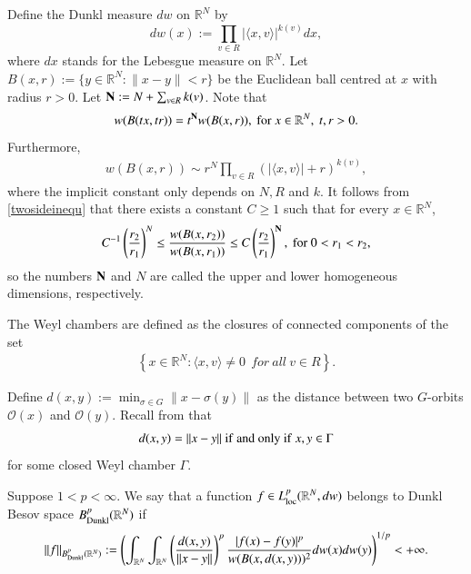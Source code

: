 \documentclass[12pt]{amsart}
\begin{document}
Define the Dunkl measure $dw$ on $\mathbb{R}^N$ by
$$
dw(x) :=\prod_{v \in R} |\langle x,v\rangle|^{k(v)} dx,
$$
where $dx$ stands for the Lebesgue measure on $\mathbb{R}^N$. Let $B(x,r):=\{y\in \mathbb{R}^N:\|x-y\|< r\}$ be the Euclidean ball centred at $x$ with radius $r>0$. Let ${\bf N}:=N+\sum_{v\in R}k(v)$. Note that
$$w(B(tx,tr))=t^{{\bf N}}w(B(x,r)),\ {\rm for}\ x\in\mathbb{R}^N,\ t,r>0.$$
Furthermore,
\begin{align}\label{twosideinequ}
  w(B(x,r))\sim r^N \prod_{v \in R}(|\langle x, v \rangle |+r)^{k(v)},
\end{align}
where the implicit constant only depends on $N,R$ and $k$.  It follows from \eqref{twosideinequ} that there exists a constant $C\geq 1$ such that for every $x\in \mathbb{R}^N$,
\begin{align}\label{doublinginequality}
C^{-1}\left(\frac{r_2}{r_1}\right)^N\leq \frac{w(B(x,r_2))}{w(B(x,r_1))}\leq C\left(\frac{r_2}{r_1}\right)^\N,\ {\rm for}\ 0<r_1<r_2,
\end{align}
so the numbers ${\bf N}$ and $N$ are called the upper and lower homogeneous dimensions, respectively.


\begin{definition}{\rm
The Weyl chambers are defined as the closures of connected components of the set
  \begin{align}
    \left\{x\in\mathbb{R}^N:\langle x,v\rangle \neq 0\ \ { for} \ { all} \ v\in R\right\}.\end{align}}
\end{definition}
Define $
	d(x,y):=\min_{\sigma\in G}\|x-\sigma(y)\|
$
as the distance between two $G$-orbits $\mathcal O(x)$ and $\mathcal O(y)$. Recall from \cite[Chapter VII, proof of Theorem 2.12]{MR514561} that
\begin{align}\label{distanceequa}
d(x,y)=\|x-y\|\ {\rm if}\ {\rm and}\ {\rm only}\ {\rm if}\ x,y\in\Gamma
\end{align}
for some closed Weyl chamber $\Gamma$.


\begin{definition}{\rm\label{beso}
Suppose $1< p< \infty$. We say that a  function $f\in L^p_{{\rm loc}}(\mathbb{R}^{N},dw)$ belongs to {\color{red}Dunkl} Besov space $B^{p}_{{\rm Dunkl}}(\mathbb{R}^N)$ if
\begin{align*}
\|f\|_{B^{p}_{{\rm Dunkl}}(\mathbb{R}^N)}:=\left(\int_{\mathbb{R}^{N}}\int_{\mathbb{R}^{N}}\left(\frac{d(x,y)}{\|x-y\|}\right)^{p}\frac{|f(x)-f(y)|^p}{w(B(x,d(x,y)))^2}dw(x)dw(y)\right)^{1/p}<+\infty.
\end{align*}}
\end{definition}
\end{document}

